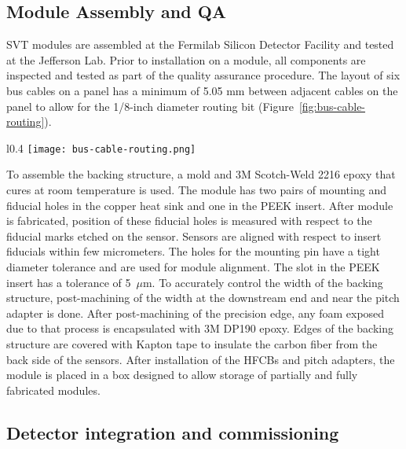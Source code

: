 \subsection{Module Assembly and QA}
SVT modules are assembled at the Fermilab Silicon Detector Facility and tested at the Jefferson Lab. Prior to installation on a module, all components are inspected and tested as part of the quality assurance procedure.  
The layout of six bus cables on a panel has a minimum of 5.05 mm between adjacent cables on the panel to allow for the 1/8-inch diameter routing bit (Figure~\ref{fig:bus-cable-routing}).

\begin{wrapfigure}{l}{0.4\columnwidth}
\texttt{[image: bus-cable-routing.png]}
\caption{Cutting of the bus cable.}
\label{fig:bus-cable-routing}
\end{wrapfigure}

To assemble the backing structure, a mold and 3M Scotch-Weld 2216 epoxy that cures at room temperature is used.
The module has two pairs of mounting and fiducial holes in the copper heat sink and one in the PEEK insert. After module is fabricated, position of these fiducial holes is measured with respect to the fiducial marks etched on the sensor. Sensors are aligned with respect to insert fiducials within few micrometers. The holes for the mounting pin have a tight diameter tolerance and are used for module alignment. The slot in the PEEK insert has a tolerance of 5~$\mu$m. To accurately control the width of the backing structure, post-machining of the width at the downstream end and near the pitch adapter is done. After post-machining of the precision edge, any foam exposed due to that process is encapsulated with 3M DP190 epoxy. Edges of the backing structure are covered with Kapton tape to insulate the carbon fiber from the back side of the sensors. After installation of the HFCBs and pitch adapters, the module is placed in a box designed to allow storage of partially and fully fabricated modules.

\subsection{Detector integration and commissioning}

